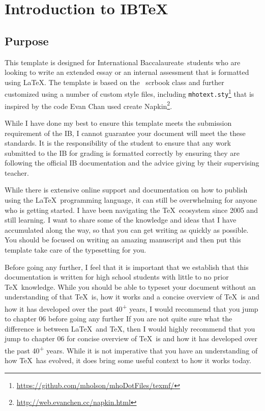 \chapter{Introduction to IB\TeX}

\section{Purpose}

This template is designed for International Baccalaureate\texttrademark\ 
students who are looking to write an extended essay or an internal assessment 
that is formatted using \LaTeX.  The template is based on the \KOMAScript\ scrbook
class and further customized using a number of custom style files, including  
\texttt{mhotext.sty}\footnote{\url{https://github.com/mholson/mhoDotFiles/texmf/}}
that is inspired by the code Evan Chan used create 
Napkin\footnote{\url{http://web.evanchen.cc/napkin.html}}. 

While I have done my best to ensure this template meets the submission
requirement of the IB, I cannot guarantee your document will meet the 
these standards.  It is the responsibility of the student to ensure that any 
work submitted to the IB for grading is formatted correctly by ensuring they 
are following the official IB documentation and the advice giving by their 
supervising teacher.

While there is extensive online support and documentation on how to publish 
using the \LaTeX\ programming language, it can still be overwhelming for anyone
who is getting started.  I have been navigating the \TeX\ ecosystem since 2005
and still learning.  I want to share some of the knowledge and ideas that I have
accumulated along the way, so that you can get writing
as quickly as possible.  You should be focused on writing an amazing 
manuscript and then put this template take care of the typesetting for you.

Before going any further, I feel that it is important that we establish that this 
documentation is written for high school students with little to no prior \TeX\ 
knowledge. While you should be able to typeset your document without an 
understanding of that \TeX\ is, how it works and a concise overview
of \TeX\ is and how it has developed over the past 40\textsuperscript{+} years,
I would recommend that you jump to chapter 06 before going any further
If you are not quite sure what the difference is between \LaTeX\ and \TeX , 
then I would highly recommend that you jump to chapter 06 for concise overview
of \TeX\ is and how it has developed over the past 40\textsuperscript{+} years.
While it is not imperative that you have an understanding of how \TeX\ has 
evolved, it does bring some useful context to how it works today.  
 

